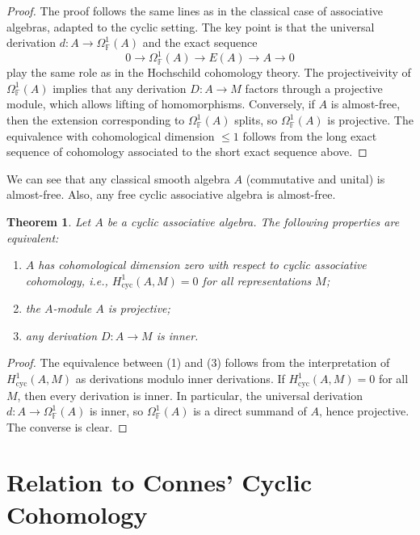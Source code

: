 \documentclass[pdflatex,sn-mathphys-num]{sn-jnl}%
\theoremstyle{thmstyleone}%
\newtheorem{theorem}{Theorem}%
\theoremstyle{thmstyletwo}%
\theoremstyle{thmstylethree}%
\begin{document}
\begin{proof}
The proof follows the same lines as in the classical case of associative algebras, adapted to the cyclic setting. The key point is that the universal derivation $d: A \to \Omega^1_{\mathbb{F}}(A)$ and the exact sequence
\[
0 \longrightarrow \Omega^1_{\mathbb{F}}(A) \longrightarrow E(A) \longrightarrow A \longrightarrow 0
\]
play the same role as in the Hochschild cohomology theory. The projectiveivity of $\Omega^1_{\mathbb{F}}(A)$ implies that any derivation $D: A \to M$ factors through a projective module, which allows lifting of homomorphisms. Conversely, if $A$ is almost-free, then the extension corresponding to $\Omega^1_{\mathbb{F}}(A)$ splits, so $\Omega^1_{\mathbb{F}}(A)$ is projective. The equivalence with cohomological dimension $\le 1$ follows from the long exact sequence of cohomology associated to the short exact sequence above. 
\end{proof}

We can see that any classical smooth algebra $A$ (commutative and unital) is almost-free. Also, any free cyclic associative algebra is almost-free.

\begin{theorem}\label{thm:cohomological_dimension_zero}
Let $A$ be a cyclic associative algebra. The following properties are equivalent:
\begin{enumerate}
\item[(1)] $A$ has cohomological dimension zero with respect to cyclic associative cohomology, i.e., $H^1_{\mathrm{cyc}}(A, M) = 0$ for all representations $M$;
\item[(2)] the $A$-module $A$ is projective;
\item[(3)] any derivation $D: A \to M$ is inner.
\end{enumerate}
\end{theorem}

\begin{proof}
The equivalence between (1) and (3) follows from the interpretation of $H^1_{\mathrm{cyc}}(A, M)$ as derivations modulo inner derivations. If $H^1_{\mathrm{cyc}}(A, M) = 0$ for all $M$, then every derivation is inner. In particular, the universal derivation $d: A \to \Omega^1_{\mathbb{F}}(A)$ is inner, so $\Omega^1_{\mathbb{F}}(A)$ is a direct summand of $A$, hence projective. The converse is clear. 
\end{proof}
\section{Relation to Connes' Cyclic Cohomology}
\end{document}
